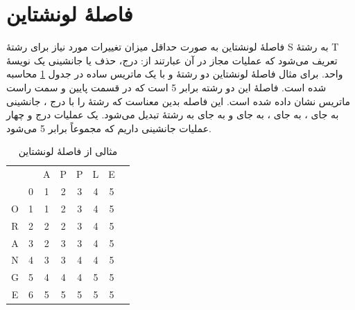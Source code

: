 \documentclass[12pt,onecolumn,a4paper]{article}
\begin{document}
    \section{فاصلۀ لونشتاین\protect{}}\label{sec:4}
    فاصلۀ لونشتاین  به صورت حداقل میزان تغییرات مورد نیاز برای رشتۀ S به رشتۀ T تعریف می‌شود که عملیات مجاز در آن عبارتند از: درج، حذف یا جانشینی یک نویسۀ واحد. برای مثال فاصلۀ لونشتاین دو رشتۀ  و  با یک ماتریس ساده در جدول \ref{table:6} محاسبه شده است. فاصلۀ این دو رشته برابر 5 است که در قسمت پایین و سمت راست ماتریس نشان داده شده است. این فاصله بدین معناست که رشتۀ  را با درج ، جانشینی  به جای ،  به جای ،  به جای  و  به جای  به رشتۀ  تبدیل می‌شود. یک عملیات درج و چهار عملیات جانشینی داریم که مجموعاً برابر 5 می‌شود.


    \begin{table}[H]
        \caption{مثالی از فاصلۀ لونشتاین}
        \label{table:6}
        \centering\setLTR
        \begin{tabular}{c|ccccccc|}
            \multicolumn{1}{c}{} & \multicolumn{1}{c}{} & \cellcolor{blue!25}A & \cellcolor{blue!25}P & \cellcolor{blue!25}P & \cellcolor{blue!25}L & \cellcolor{blue!25}E \tabularnewline \hhline{~|*{6}{-}}
            & 0 & 1 & 2 & 3 & 4 & 5  \tabularnewline
            \cellcolor{blue!25}O & 1 & 1 & 2 & 3 & 4 & 5   \tabularnewline
            \cellcolor{blue!25}R & 2 & 2 & 2 & 3 & 4 & 5   \tabularnewline
            \cellcolor{blue!25}A & 3 & 2 & 3 & 3 & 4 & 5   \tabularnewline
            \cellcolor{blue!25}N & 4 & 3 & 3 & 4 & 4 & 5   \tabularnewline
            \cellcolor{blue!25}G & 5 & 4 & 4 & 4 & 5 & 5   \tabularnewline
            \cellcolor{blue!25}E & 6 & 5 & 5 & 5 & 5 & 5   \tabularnewline
        \end{tabular}
        \setRTL
    \end{table}
\end{document}
